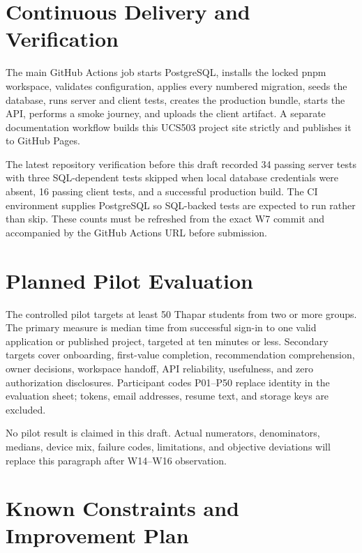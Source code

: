 \documentclass[11pt,a4paper]{article}
\begin{document}
\section{Continuous Delivery and Verification}

The main GitHub Actions job starts PostgreSQL, installs the locked pnpm workspace, validates configuration, applies every numbered migration, seeds the database, runs server and client tests, creates the production bundle, starts the API, performs a smoke journey, and uploads the client artifact. A separate documentation workflow builds this UCS503 project site strictly and publishes it to GitHub Pages.

The latest repository verification before this draft recorded 34 passing server tests with three SQL-dependent tests skipped when local database credentials were absent, 16 passing client tests, and a successful production build. The CI environment supplies PostgreSQL so SQL-backed tests are expected to run rather than skip. These counts must be refreshed from the exact W7 commit and accompanied by the GitHub Actions URL before submission.

\section{Planned Pilot Evaluation}

The controlled pilot targets at least 50 Thapar students from two or more groups. The primary measure is median time from successful sign-in to one valid application or published project, targeted at ten minutes or less. Secondary targets cover onboarding, first-value completion, recommendation comprehension, owner decisions, workspace handoff, API reliability, usefulness, and zero authorization disclosures. Participant codes P01--P50 replace identity in the evaluation sheet; tokens, email addresses, resume text, and storage keys are excluded.

No pilot result is claimed in this draft. Actual numerators, denominators, medians, device mix, failure codes, limitations, and objective deviations will replace this paragraph after W14--W16 observation.

\section{Known Constraints and Improvement Plan}
\end{document}
